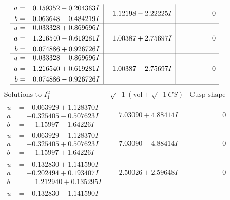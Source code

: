 \documentclass[1p]{elsarticle_modified}
\theoremstyle{definition}
\newcommand{\I}{\sqrt{-1}}
\begin{document}
$$\begin{array}{c|c|c}
\begin{aligned}
a &= \phantom{-}0.159352 - 0.204363 I \\
b &= -0.063648 - 0.484219 I\end{aligned}
 & \phantom{-}1.12198 - 2.22225 I & \phantom{-0.000000 } 0 \\ \hline\begin{aligned}
u &= -0.033328 + 0.869696 I \\
a &= \phantom{-}1.216540 - 0.619281 I \\
b &= \phantom{-}0.074886 + 0.926726 I\end{aligned}
 & \phantom{-}1.00387 + 2.75697 I & \phantom{-0.000000 } 0 \\ \hline\begin{aligned}
u &= -0.033328 - 0.869696 I \\
a &= \phantom{-}1.216540 + 0.619281 I \\
b &= \phantom{-}0.074886 - 0.926726 I\end{aligned}
 & \phantom{-}1.00387 - 2.75697 I & \phantom{-0.000000 } 0\\
 \hline 
 \end{array}$$\newpage$$\begin{array}{c|c|c}  
\text{Solutions to }I^u_{1}& \I (\text{vol} + \sqrt{-1}CS) & \text{Cusp shape}\\
 \hline 
\begin{aligned}
u &= -0.063929 + 1.128370 I \\
a &= -0.325405 - 0.507623 I \\
b &= \phantom{-}1.15997 - 1.64226 I\end{aligned}
 & \phantom{-}7.03090 + 4.88414 I & \phantom{-0.000000 } 0 \\ \hline\begin{aligned}
u &= -0.063929 - 1.128370 I \\
a &= -0.325405 + 0.507623 I \\
b &= \phantom{-}1.15997 + 1.64226 I\end{aligned}
 & \phantom{-}7.03090 - 4.88414 I & \phantom{-0.000000 } 0 \\ \hline\begin{aligned}
u &= -0.132830 + 1.141590 I \\
a &= -0.202494 + 0.193407 I \\
b &= \phantom{-}1.212940 + 0.135295 I\end{aligned}
 & \phantom{-}2.50026 + 2.59648 I & \phantom{-0.000000 } 0 \\ \hline\begin{aligned}
u &= -0.132830 - 1.141590 I \\

\end{aligned}
\end{array}$$
\end{document}

